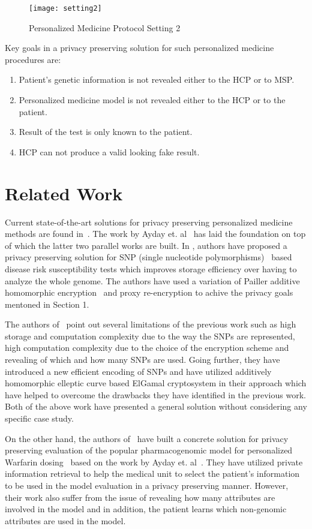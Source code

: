 \documentclass[10pt,letterpaper]{article}
\begin{document}
\begin{multicols}{2}
\begin{figure}[H]
\label{prot2}
\centering
\texttt{[image: setting2]}
\caption{Personalized Medicine Protocol Setting 2}
\end{figure}

Key goals in a privacy preserving solution for such personalized medicine procedures are:
\begin{enumerate}
 \item Patient's genetic information is not revealed either to the HCP or to MSP.
 \item Personalized medicine model is not revealed either to the HCP or to the patient.
 \item Result of the test is only known to the patient.
 \item HCP can not produce a valid looking fake result.
\end{enumerate}

\section{Related Work}
Current state-of-the-art solutions for privacy preserving personalized medicine methods are found in~\cite{Ayday, Cristofaro, Djatmiko}. The work by 
Ayday et. al~\cite{Ayday} has laid the foundation on top of which the latter two parallel works are built. In \cite{Ayday}, authors have proposed a privacy 
preserving solution for SNP (single nucleotide polymorphisms)~\cite{SNP} based disease risk susceptibility tests which improves storage efficiency over 
having to analyze the whole genome. The authors have used a variation of Pailler additive homomorphic encryption~\cite{BCP} and proxy re-encryption to 
achive the privacy goals mentoned in Section 1. 

The authors of~\cite{Cristofaro} point out several limitations of the previous work such as high storage and computation complexity due to the
way the SNPs are represented, high computation complexity due to the choice of the encryption scheme and revealing of which and how many SNPs are used.
Going further, they have introduced a new efficient encoding of SNPs and have utilized additively homomorphic elleptic curve based ElGamal cryptosystem in
their approach which have helped to overcome the drawbacks they have identified in the previous work. Both of the above work have presented a general
solution without considering any specific case study. 

On the other hand, the authors of~\cite{Djatmiko} have built a concrete solution for privacy preserving evaluation of the popular pharmacogenomic model for 
personalized Warfarin dosing~\cite{Warfarin} based on the work by Ayday et. al~\cite{Ayday}. They have utilized private information retrieval to help the 
medical unit to select the patient's information to be used in the model evaluation in a privacy preserving manner. However, their work also suffer from 
the issue of revealing how  many attributes are involved in the model and in addition, the patient learns which non-genomic attributes are used in the model.


\end{multicols}
\end{document}
